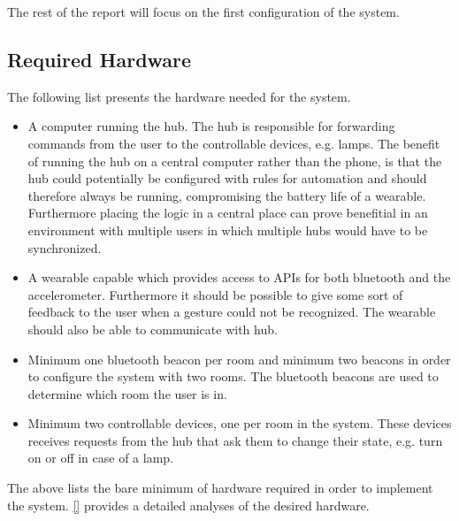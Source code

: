 
The rest of the report will focus on the first configuration of the system.

\subsection{Required Hardware}
\label{sec:analysis:system-components:required-hardware}

The following list presents the hardware needed for the system.

\begin{itemize}
\item A computer running the hub. The hub is responsible for forwarding commands from the user to the controllable devices, e.g. lamps. The benefit of running the hub on a central computer rather than the phone, is that the hub could potentially be configured with rules for automation and should therefore always be running, compromising the battery life of a wearable. Furthermore placing the logic in a central place can prove benefitial in an environment with multiple users in which multiple hubs would have to be synchronized.
\item A wearable capable which provides access to APIs for both bluetooth and the accelerometer. Furthermore it should be possible to give some sort of feedback to the user when a gesture could not be recognized. The wearable should also be able to communicate with hub.
\item Minimum one bluetooth beacon per room and minimum two beacons in order to configure the system with two rooms. The bluetooth beacons are used to determine which room the user is in.
\item Minimum two controllable devices, one per room in the system. These devices receives requests from the hub that ask them to change their state, e.g. turn on or off in case of a lamp.
\end{itemize}

The above lists the bare minimum of hardware required in order to implement the system. \cref{} provides a detailed analyses of the desired hardware. 

